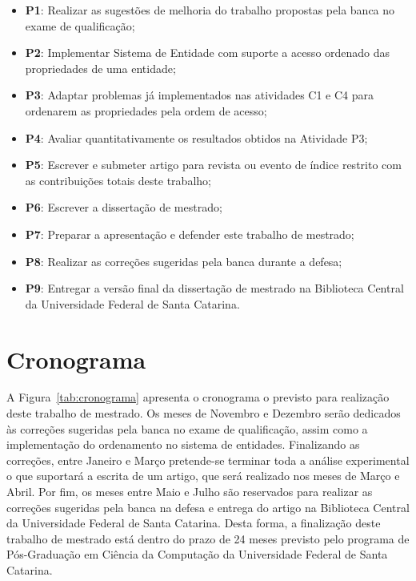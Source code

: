 \begin{itemize}
    \item \textbf{P1}: Realizar as sugestões de melhoria do trabalho propostas pela banca no exame de qualificação;
    \item \textbf{P2}: Implementar Sistema de Entidade com suporte a acesso ordenado das propriedades de uma entidade;
    \item \textbf{P3}: Adaptar problemas já implementados nas atividades C1 e C4 para ordenarem as propriedades pela ordem de acesso;
    \item \textbf{P4}: Avaliar quantitativamente os resultados obtidos na Atividade P3;
    \item \textbf{P5}: Escrever e submeter artigo para revista ou evento de índice restrito com as contribuições totais deste trabalho;
    \item \textbf{P6}: Escrever a dissertação de mestrado;
    \item \textbf{P7}: Preparar a apresentação e defender este trabalho de mestrado;
    \item \textbf{P8}: Realizar as correções sugeridas pela banca durante a defesa;
    \item \textbf{P9}: Entregar a versão final da dissertação de mestrado na Biblioteca Central da Universidade Federal de Santa Catarina.
\end{itemize}

\section{Cronograma}

A Figura~\ref{tab:cronograma} apresenta o cronograma o previsto para realização deste trabalho de mestrado.
Os meses de Novembro e Dezembro serão dedicados às correções sugeridas pela banca no exame de qualificação, assim como a implementação do ordenamento no sistema de entidades.
Finalizando as correções, entre Janeiro e Março pretende-se terminar toda a análise experimental o que suportará a escrita de um artigo, que será realizado nos meses de Março e Abril.
Por fim, os meses entre Maio e Julho são reservados para realizar as correções sugeridas pela banca na defesa e entrega do artigo na Biblioteca Central da Universidade Federal de Santa Catarina.
Desta forma, a finalização deste trabalho de mestrado está dentro do prazo de 24 meses previsto pelo programa de Pós-Graduação em Ciência da Computação da Universidade Federal de Santa Catarina.


